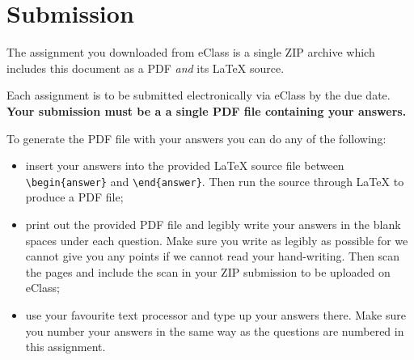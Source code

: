 \documentclass{article}
\begin{document}
\clearpage
\section*{Submission}
The assignment you downloaded from eClass is a single ZIP archive which includes this document as a PDF {\em and} its \LaTeX{} source.

\medskip

Each assignment is to be submitted electronically via eClass by the due date.
\textbf{Your submission must be a a single PDF file containing your answers.} 

To generate the PDF file with your answers you can do any of the following:

\begin{itemize}
    \item
    insert your answers into the provided \LaTeX{} source file between \verb|\begin{answer}| and \verb|\end{answer}|. Then run the source through \LaTeX{} to produce a PDF file;

    \item print out the provided PDF file and legibly write your answers in the blank spaces under each question. Make sure you write as legibly as possible for we cannot give you any points if we cannot read your hand-writing. Then scan the pages and include the scan in your ZIP submission to be uploaded on eClass;

    \item use your favourite text processor and type up your answers there. Make sure you number your answers in the same way as the questions are numbered in this assignment.
\end{itemize}

%
%
\end{document}
